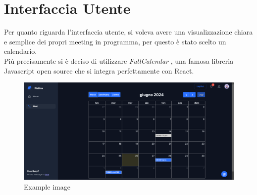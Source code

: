 \section{Interfaccia Utente}
Per quanto riguarda l'interfaccia utente, si voleva avere una visualizzazione chiara
e semplice dei propri meeting in programma, per questo è stato scelto un calendario.
\\
Più precisamente si è deciso di utilizzare \textit{FullCalendar} \cite{FullCalendarSite},
una famosa libreria Javascript open source che si integra perfettamente con React.

\begin{figure}[H]
    \centering
    \includegraphics[width=1\textwidth]{../screenshot/visualizzazione claendario/tema scuro calendario.png}
    \caption{Example image}
    \label{img:visualizzazione_calendario_interfaccia_utente}
\end{figure}

